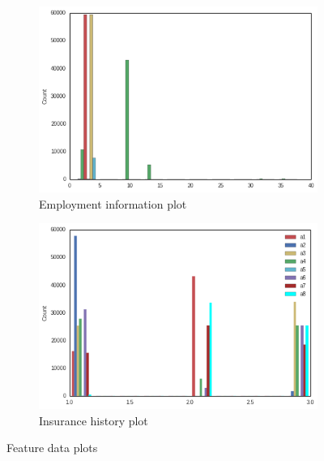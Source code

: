 \begin{figure}[hh!]
  \centering
  \begin{subfigure}[b]{0.4\textwidth}
     \includegraphics[width=\textwidth]{EmploymentInfo.png}
     \caption{Employment information plot}
     \label{imbalance}
  \end{subfigure}
  \quad
   \begin{subfigure}[b]{0.4\textwidth}
      \includegraphics[width=\textwidth]{Insurancehist.png}
      \caption{Insurance history plot}   
   \end{subfigure}
   \caption{Feature data plots}
\end{figure}



%
%
%

